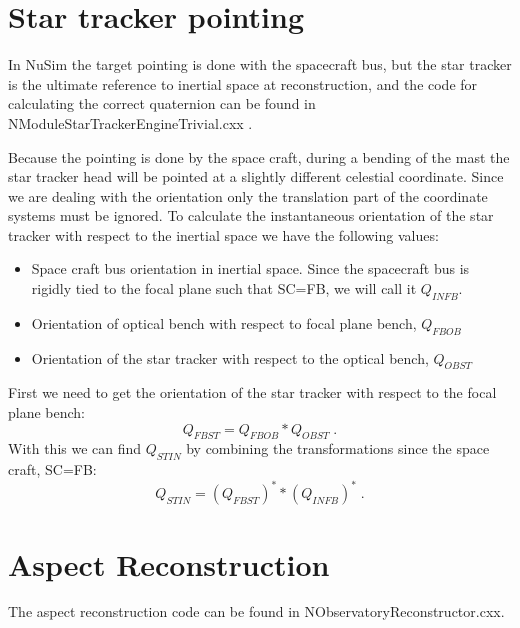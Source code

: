 \documentclass[11pt]{article}
\begin{document}
\section{Star tracker pointing}
In NuSim the target pointing is done with the spacecraft bus, but the star tracker is the ultimate reference to inertial space at reconstruction, and the code for calculating the correct quaternion can be found in NModuleStarTrackerEngineTrivial.cxx . 

Because the pointing is done by the space craft, during a bending of the mast the star tracker head will be pointed at a slightly different celestial coordinate. Since we are dealing with the orientation only the translation part of the coordinate systems must be ignored. To calculate the instantaneous orientation of the star tracker with respect to the inertial space we have the following values:
\begin{itemize}
\item Space craft bus orientation in inertial space. Since the spacecraft bus is rigidly tied to the focal plane such that SC=FB, we will call it $Q_{INFB}$.
\item Orientation of optical bench with respect to focal plane bench, $Q_{FBOB}$
\item Orientation of the star tracker with respect to the optical bench, $Q_{OBST}$
\end{itemize}

First we need to get the orientation of the star tracker with respect to the focal plane bench:
\begin{equation}
Q_{FBST} = Q_{FBOB}*Q_{OBST} \; .
\end{equation}
With this we can find $Q_{STIN}$ by combining the transformations since the space craft, SC=FB: 
\begin{equation}
Q_{STIN} = (Q_{FBST})^**(Q_{INFB})^* \; .
\end{equation}

\section{Aspect Reconstruction}
The aspect reconstruction code can be found in NObservatoryReconstructor.cxx.
\end{document}
